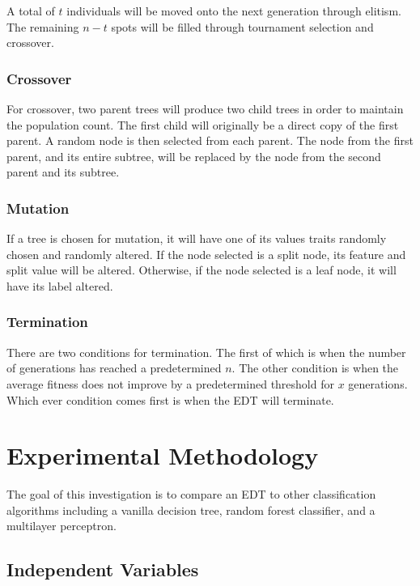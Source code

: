 \documentclass[12pt]{article}
\begin{document}
A total of $t$ individuals will be moved onto the next generation through elitism. The remaining $n - t$ spots will be filled through tournament selection and crossover.

\subsubsection{Crossover}

For crossover, two parent trees will produce two child trees in order to maintain the population count. The first child will originally be a direct copy of the first parent. A random node is then selected from each parent. The node from the first parent, and its entire subtree, will be replaced by the node from the second parent and its subtree.


\subsubsection{Mutation}

If a tree is chosen for mutation, it will have one of its values traits randomly chosen and randomly altered. If the node selected is a split node, its feature and split value will be altered. Otherwise, if the node selected is a leaf node, it will have its label altered.

\subsubsection{Termination}

There are two conditions for termination. The first of which is when the number of generations has reached a predetermined $n$. The other condition is when the average fitness does not improve by a predetermined threshold for $x$ generations. Which ever condition comes first is when the EDT will terminate.

\section{Experimental Methodology}

The goal of this investigation is to compare an EDT to other classification algorithms including a vanilla decision tree, random forest classifier, and a multilayer perceptron.

\subsection{Independent Variables}
\end{document}
